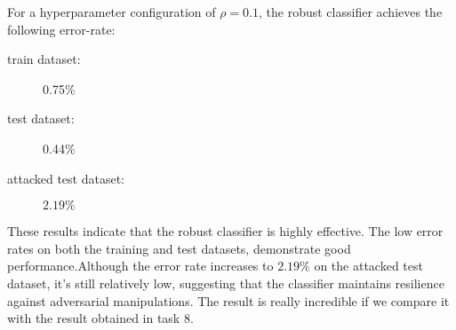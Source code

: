 \documentclass[a4paper,12pt]{report}
\begin{document}
For a hyperparameter configuration of $\rho=0.1$, the robust classifier achieves the following error-rate: 
\begin{description}
\item[train dataset:]{0.75\%}
\item[test dataset:]{0.44\%}
\item[attacked test dataset:]{$2.19\%$}
\end{description}

These results indicate that the robust classifier is highly effective. The low error rates on both the training and test datasets, demonstrate good performance.Although the error rate increases to {$2.19\%$} on the attacked test dataset, it’s still relatively low, suggesting that the classifier maintains resilience against adversarial manipulations. The result is really incredible if we compare it with the result obtained in task 8.
\end{document}
